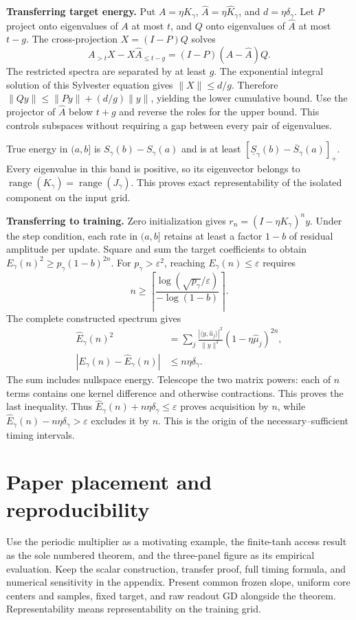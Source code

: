 \documentclass[11pt]{article}
\DeclareMathOperator{\range}{range}
\theoremstyle{definition}
\begin{document}
\textbf{Transferring target energy.}
Put $A=\eta K_\gamma$, $\widehat A=\eta\widehat K_\gamma$, and
$d=\eta\delta_\gamma$. Let $P$ project onto eigenvalues of $A$ at most $t$,
and $Q$ onto eigenvalues of $\widehat A$ at most $t-g$. The cross-projection
$X=(I-P)Q$ solves
\[
A_{>t}X-X\widehat A_{\le t-g}=(I-P)(A-\widehat A)Q.
\]
The restricted spectra are separated by at least $g$. The exponential
integral solution of this Sylvester equation gives $\|X\|\le d/g$.
Therefore $\|Qy\|\le\|Py\|+(d/g)\|y\|$, yielding the lower cumulative
bound. Use the projector of $\widehat A$ below $t+g$ and reverse the roles
for the upper bound. This controls subspaces without requiring a gap
between every pair of eigenvalues.

True energy in $(a,b]$ is $S_\gamma(b)-S_\gamma(a)$ and is at least
$[\underline S_\gamma(b)-\overline S_\gamma(a)]_+$.
Every eigenvalue in this band is positive, so its eigenvector belongs to
$\range(K_\gamma)=\range(J_\gamma)$. This proves exact representability
of the isolated component on the input grid.

\textbf{Transferring to training.}
Zero initialization gives $r_n=(I-\eta K_\gamma)^ny$. Under the step
condition, each rate in $(a,b]$ retains at least a factor $1-b$ of residual
amplitude per update.
Square and sum the target coefficients to obtain
$E_\gamma(n)^2\ge p_\gamma(1-b)^{2n}$.
For $p_\gamma>\varepsilon^2$, reaching $E_\gamma(n)\le\varepsilon$ requires
\[
n\ge\left\lceil
\frac{\log(\sqrt{p_\gamma}/\varepsilon)}{-\log(1-b)}
\right\rceil.
\]
The complete constructed spectrum gives
\begin{align*}
\widehat E_\gamma(n)^2
&=\sum_j\frac{|\langle y,\widehat u_j\rangle|^2}{\|y\|^2}
(1-\eta\widehat\mu_j)^{2n},\\
|E_\gamma(n)-\widehat E_\gamma(n)|&\le n\eta\delta_\gamma.
\end{align*}
The sum includes nullspace energy. Telescope the two matrix powers:
each of $n$ terms contains one kernel difference and otherwise contractions.
This proves the last inequality. Thus
$\widehat E_\gamma(n)+n\eta\delta_\gamma\le\varepsilon$ proves acquisition
by $n$, while $\widehat E_\gamma(n)-n\eta\delta_\gamma>\varepsilon$ excludes
it by $n$. This is the origin of the necessary--sufficient timing intervals.

\section{Paper placement and reproducibility}
Use the periodic multiplier as a motivating example, the finite-tanh access
result as the sole numbered theorem, and the three-panel figure as its
empirical evaluation. Keep the scalar construction, transfer proof, full
timing formula, and numerical sensitivity in the appendix. Present common
frozen slope, uniform core centers and samples, fixed target, and raw readout
GD alongside the theorem. Representability means representability on the
training grid.
\end{document}
